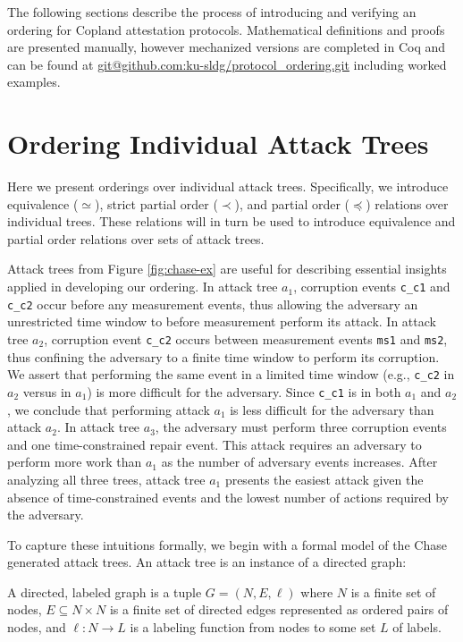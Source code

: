 \documentclass[runningheads]{llncs}
\theoremstyle{definition}
\begin{document}
The following sections describe the process of introducing and
verifying an ordering for Copland attestation protocols. 
Mathematical definitions and proofs are presented manually, however
mechanized versions are completed in Coq and can be found at
\url{git@github.com:ku-sldg/protocol_ordering.git} including worked
examples. 

\section{Ordering Individual Attack Trees}

Here we present orderings over individual attack trees. Specifically,
we introduce equivalence ($\simeq$), strict partial order ($\prec$),
and partial order ($\preceq$) relations over individual trees. These
relations will in turn be used to introduce equivalence and partial
order relations over sets of attack trees.

Attack trees from Figure \ref{fig:chase-ex} are useful for describing
essential insights applied in developing our ordering. In attack tree
$a_1$, corruption events \texttt{c\_c1} and \texttt{c\_c2} occur
before any measurement events, thus allowing the adversary an
unrestricted time window to before measurement perform its attack. In
attack tree $a_2$, corruption event \texttt{c\_c2} occurs between
measurement events \texttt{ms1} and \texttt{ms2}, thus confining the
adversary to a finite time window to perform its corruption. We
assert that performing the same event in a limited time window (e.g.,
\texttt{c\_c2} in $a_2$ versus in $a_1$) is more difficult for the
adversary. Since \texttt{c\_c1} is in both $a_1$ and $a_2$, we
conclude that performing attack $a_1$ is less difficult for the
adversary than attack $a_2$.  In attack tree $a_3$, the adversary must
perform three corruption events and one time-constrained repair
event. This attack requires an adversary to perform more work than
$a_1$ as the number of adversary events increases. After analyzing all
three trees, attack tree $a_1$ presents the easiest attack given the
absence of time-constrained events and the lowest number of actions
required by the adversary.

To capture these intuitions formally, we begin with a formal model of
the Chase generated attack trees. An attack tree is an instance of a
directed graph:

\begin{definition}
    A directed, labeled graph is a tuple $G = (N, E, \ell)$ where $N$
    is a finite set of nodes, $E \subseteq N \times N$ is a finite set
    of directed edges represented as ordered pairs of nodes, and $\ell
    : N \rightarrow L$ is a labeling function from nodes to some set
    $L$ of labels. 
\end{definition} 
 
\end{document}
